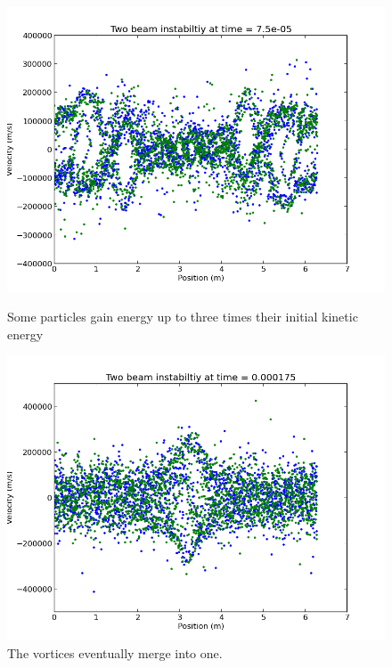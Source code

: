 \documentclass[12pt]{article}
\begin{document}
\begin{figure}
\vspace*{0.5cm} %
\begin{minipage}[t]{0.45\textwidth}
\includegraphics[width=\linewidth]{t=2.png}
\caption{Some particles gain energy up to three times their initial kinetic energy}
\label{fig:distal}
\end{minipage}
\hspace{\fill}
\begin{minipage}[t]{0.45\textwidth}
\includegraphics[width=\linewidth]{t=4.png}
\caption{The vortices eventually merge into one.}
\label{fig:combined}
\end{minipage}

\end{figure}
\end{document}
